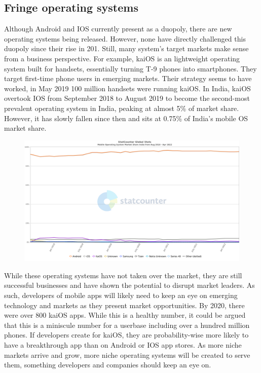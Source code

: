 \documentclass{article}
\begin{document}
\subsection{Fringe operating systems}
\tab Although Android and IOS currently present as a duopoly, there are new operating systems being released. However, none have directly challenged this duopoly since their rise in 201. Still, many system's target markets make sense from a business perspective. For example, kaiOS is an lightweight operating system built for handsets, essentially turning T-9 phones into smartphones. They target first-time phone users in emerging markets. Their strategy seems to have worked, in May 2019 100 million handsets were running kaiOS.\cite{lunden_2019} In India, kaiOS overtook IOS from September 2018 to August 2019 to become the second-most prevalent operating system in India, peaking at almost 5\% of market share. However, it has slowly fallen since then and sits at 0.75\% of India's mobile OS market share.\cite{statcounter_india}
\begin{figure}[h]
\centerline{\includegraphics[scale=.45]{StatCounter-os_India.png}}
\label{fig}
\end{figure}
While these operating systems have not taken over the market, they are still successful businesses and have shown the potential to disrupt market leaders. As such, developers of mobile apps will likely need to keep an eye on emerging technology and markets as they present market opportunities. By 2020, there were over 800 kaiOS apps.\cite{vaghela_2021} While this is a healthy number, it could be argued that this is a miniscule number for a userbase including over a hundred million phones. If developers create for kaiOS, they are probability-wise more likely to have a breakthrough app than on Android or IOS app stores. As more niche markets arrive and grow, more niche operating systems will be created to serve them, something developers and companies should keep an eye on.
\end{document}
